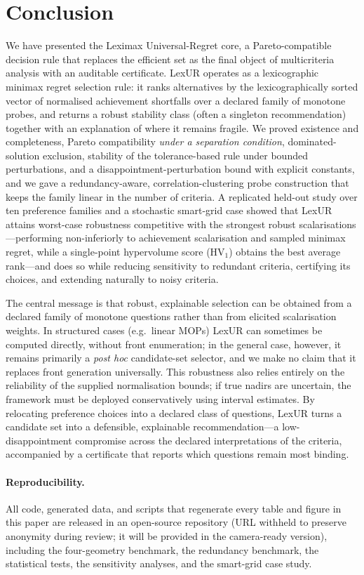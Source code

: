 \section{Conclusion}
\label{sec:conc}

We have presented the Leximax Universal-Regret core, a Pareto-compatible decision
rule that replaces the efficient set as the final object of multicriteria analysis
with an auditable certificate. LexUR operates as a lexicographic minimax regret selection rule: it ranks alternatives by the
lexicographically sorted vector of normalised achievement shortfalls over a declared family of
monotone probes, and returns a robust stability class (often a singleton recommendation) together with an
explanation of where it remains fragile. We proved existence and completeness,
Pareto compatibility \emph{under a separation condition}, dominated-solution
exclusion, stability of the tolerance-based rule under bounded perturbations, and
a disappointment-perturbation bound with explicit constants, and we gave a
redundancy-aware, correlation-clustering probe construction that keeps the family
linear in the number of criteria. A replicated held-out study over ten preference
families and a stochastic smart-grid case showed that LexUR attains
worst-case robustness competitive with the strongest robust
scalarisations---performing non-inferiorly to achievement scalarisation and
sampled minimax regret, while a single-point hypervolume score ($\mathrm{HV}_1$) obtains the best average rank---and does
so while reducing sensitivity to redundant criteria, certifying
its choices, and extending naturally to noisy criteria.

The central message is that robust, explainable selection can be obtained from a declared family of monotone questions rather than from elicited scalarisation weights. In structured cases (e.g.\ linear MOPs) LexUR can sometimes be computed directly, without front enumeration; in the general case, however, it remains primarily a \emph{post hoc} candidate-set selector, and we make no claim that it replaces front generation universally. This robustness also relies entirely on the reliability of the supplied normalisation bounds; if true nadirs are uncertain, the framework must be deployed conservatively using interval estimates. By relocating preference choices into a declared class of questions, LexUR turns a candidate set into a defensible,
explainable recommendation---a low-disappointment compromise across the declared
interpretations of the criteria, accompanied by a certificate that reports which
questions remain most binding.

\paragraph{Reproducibility.}
All code, generated data, and scripts that regenerate every table and figure in
this paper are released in an open-source repository (URL withheld to preserve
anonymity during review; it will be provided in the camera-ready version),
including the four-geometry benchmark, the redundancy
benchmark, the statistical tests, the sensitivity analyses, and the smart-grid
case study.

